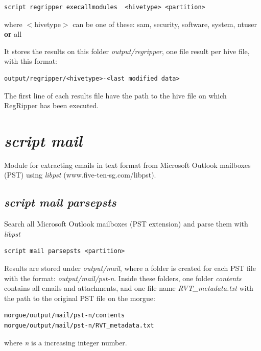\documentclass[a4paper,11pt,oneside]{report}
\begin{document}
\begin{verbatim}
script regripper execallmodules  <hivetype> <partition>
\end{verbatim}

where $<$hivetype$>$ can be one of these: sam, security, software, system, ntuser  \textbf{or} all 

It stores the results on this folder \emph{output/regripper}, one file result per hive file, with this format:

\begin{verbatim}
output/regripper/<hivetype>-<last modified data>
\end{verbatim}

The first line of each results file have the path to the hive file on which RegRipper has been executed. 





\section{\emph{script mail}}

Module for extracting emails in text format from Microsoft Outlook mailboxes (PST) using \emph{libpst} (www.five-ten-sg.com/libpst).

\subsection{\emph{script mail parsepsts}}

Search all Microsoft Outlook mailboxes (PST extension) and parse them with \emph{libpst}

\begin{verbatim}
script mail parsepsts <partition>
\end{verbatim}

Results are stored under \emph{output/mail}, where a folder is created for each PST file with the format:  \emph{output/mail/pst-n}. Inside these folders, one folder \emph{contents} contains all emails and attachments, and one file name \emph{RVT\_metadata.txt} with the path to the original PST file on the morgue:

\begin{verbatim}
morgue/output/mail/pst-n/contents
morgue/output/mail/pst-n/RVT_metadata.txt
\end{verbatim}

where \emph{n} is a increasing integer number.
\end{document}
